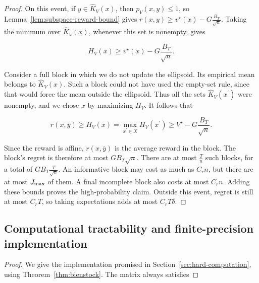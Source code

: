{{\begin{proof}
On this event, if $y \in {\hat{K}}_{V} \left( x \right)$, then $p_{V} \left( x , y \right) \le 1$, so
Lemma~\ref{lem:subspace-reward-bound} gives
$r \left( x , y \right) \ge v^{\star} \left( x \right) - G \frac{B_{T}}{\sqrt{n}}$. Taking the minimum over
${\hat{K}}_{V} \left( x \right)$, whenever this set is nonempty, gives



\begin{equation}
H_{V} \left( x \right) \ge v^{\star} \left( x \right) - G \frac{B_{T}}{\sqrt{n}} .\label{eq:hard-optimism}
\end{equation}



Consider a full block in which we do not update the ellipsoid. Its
empirical mean belongs to ${\hat{K}}_{V} \left( x \right)$. Such a block could not have
used the empty-set rule, since that would force the mean outside the
ellipsoid. Thus all the sets ${\hat{K}}_{V} \left( x^{\prime} \right)$ were nonempty, and we
chose $x$ by maximizing $H_{V}$. It follows that


\begin{equation*}
r \left( x , \overline{y} \right) \ge H_{V} \left( x \right) = \operatorname*{max}_{x^{\prime} \in X} H_{V} \left( x^{\prime} \right) \ge V^{\star} - G \frac{B_{T}}{\sqrt{n}} .
\end{equation*}


Since the reward is affine, $r \left( x , \overline{y} \right)$ is the average reward
in the block. The block's regret is therefore at most $G B_{T} \sqrt{n}$.
There are at most $\frac{T}{n}$ such blocks, for a total of $G B_{T} \frac{T}{\sqrt{n}}$.
An informative block may cost as much as $C_{r} n$, but there are at most
$J_{\text{\normalfont max}}$ of them. A final incomplete block also costs at most $C_{r} n$.
Adding these bounds proves the high-probability claim. Outside this
event, regret is still at most $C_{r} T$, so taking expectations
adds at most $C_{r} T \delta$.
\end{proof}


\subsection{Computational tractability and finite-precision implementation}\label{app:hard-computation}

\begin{proof}

We give the implementation promised in Section~\ref{sec:hard-computation}, using Theorem~\ref{thm:bienstock}. The matrix
always satisfies



\end{proof}}}

